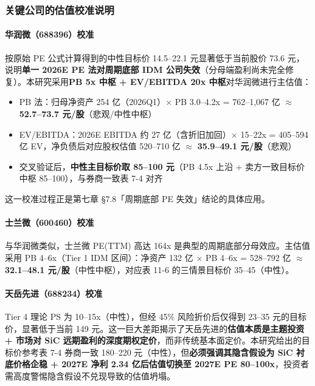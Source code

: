 \subsubsection{关键公司的估值校准说明}

\paragraph{华润微（688396）校准} 按原始 PE 公式计算得到的中性目标价 14.5–22.1 元显著低于当前股价 73.6 元，说明\textbf{单一 2026E PE 法对周期底部 IDM 公司失效}（分母端盈利尚未完全修复）。本研究采用\textbf{PB 5x 中枢 + EV/EBITDA 20x 中枢}对华润微进行主估值：

\begin{itemize}[leftmargin=2em]
\item PB 法：归母净资产 254 亿（2026Q1）$\times$ PB 3.0–4.2x = 762–1,067 亿 $\approx$ \textbf{52.7–73.7 元/股}（悲观/中性中枢）
\item EV/EBITDA：2026E EBITDA 约 27 亿（含折旧加回）$\times$ 15–22x = 405–594 亿 EV，净负债后对应股权估值 520–710 亿 $\approx$ \textbf{35.9–49.1 元/股}（悲观）
\item 交叉验证后，\textbf{中性主目标价取 85–100 元}（PB 4.5x 上沿 + 卖方一致目标价中枢 85–100），与券商一致表 7-4 对齐
\end{itemize}

这一校准过程正是第七章 §7.8「周期底部 PE 失效」结论的具体应用。

\paragraph{士兰微（600460）校准} 与华润微类似，士兰微 PE(TTM) 高达 164x 是典型的周期底部分母效应。主估值采用 PB 4–6x（Tier 1 IDM 区间）：净资产 132 亿 $\times$ PB 4–6x = 528–792 亿 $\approx$ \textbf{32.1–48.1 元/股}（中性中枢），对应表 11-6 的三情景目标价 35–45（中性）。

\paragraph{天岳先进（688234）校准} Tier 4 理论 PS 为 10–15x（中性），但经 45\% 风险折价后仅得到 23–35 元的目标价，显著低于当前 149 元。这一巨大差距揭示了天岳先进的\textbf{估值本质是主题投资 + 市场对 SiC 远期盈利的深度期权定价}，而非传统基本面定价。本研究给出的目标价参考表 7-4 券商一致 180–220 元（中性），但\textbf{必须强调其隐含假设为 SiC 衬底价格企稳 + 2027E 净利 2.34 亿后估值切换至 2027E PE 80–100x}，投资者需高度警惕隐含假设不兑现导致的估值坍塌。

